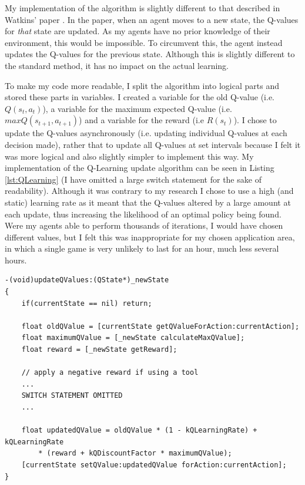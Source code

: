 \documentclass[a4paper,oneside]{report}
\begin{document}
My implementation of the algorithm is slightly different to that described in Watkins' paper \cite{Watkins:1989mi}. In the paper, when an agent moves to a new state, the Q-values for \emph{that} state are updated. As my agents have no prior knowledge of their environment, this would be impossible. To circumvent this, the agent instead updates the Q-values for the previous state. Although this is slightly different to the standard method, it has no impact on the actual learning.

To make my code more readable, I split the algorithm into logical parts and stored these parts in variables. I created a variable for the old Q-value (i.e. $Q(s_t, a_t)$), a variable for the maximum expected Q-value (i.e. $max Q(s_{t+1}, a_{t+1})$) and a variable for the reward (i.e $R(s_t)$). I chose to update the Q-values asynchronously (i.e. updating individual Q-values at each decision made), rather that to update all Q-values at set intervals because I felt it was more logical and also slightly simpler to implement this way. My implementation of the Q-Learning update algorithm can be seen in Listing \ref{lst:QLearning} (I have omitted a large switch statement for the sake of readability). Although it was contrary to my research I chose to use a high (and static) learning rate as it meant that the Q-values altered by a large amount at each update, thus increasing the likelihood of an optimal policy being found. Were my agents able to perform thousands of iterations, I would have chosen different values, but I felt this was inappropriate for my chosen application area, in which a single game is very unlikely to last for an hour, much less several hours.

\begin{lstlisting}[label={lst:QLearning},caption=Implementation of The Q-Learning Algorithm]
-(void)updateQValues:(QState*)_newState
{    
    if(currentState == nil) return;
            
    float oldQValue = [currentState getQValueForAction:currentAction];
    float maximumQValue = [_newState calculateMaxQValue];
    float reward = [_newState getReward];
    
    // apply a negative reward if using a tool
    ...
    SWITCH STATEMENT OMITTED 
    ...
        
    float updatedQValue = oldQValue * (1 - kQLearningRate) + kQLearningRate 
    	* (reward + kQDiscountFactor * maximumQValue);
    [currentState setQValue:updatedQValue forAction:currentAction];
}
\end{lstlisting}
\end{document}
